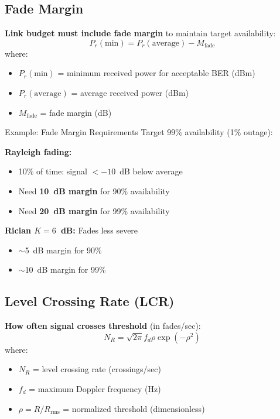 \subsection{Fade Margin}

\textbf{Link budget must include fade margin} to maintain target availability:
\begin{equation}
P_r(\text{min}) = P_r(\text{average}) - M_{\text{fade}}
\label{eq:fade-margin}
\end{equation}
where:
\begin{itemize}
\item $P_r(\text{min})$ = minimum received power for acceptable BER (dBm)
\item $P_r(\text{average})$ = average received power (dBm)
\item $M_{\text{fade}}$ = fade margin (dB)
\end{itemize}

\begin{calloutbox}{Example: Fade Margin Requirements}
Target 99\% availability (1\% outage):

\textbf{Rayleigh fading:}
\begin{itemize}
\item 10\% of time: signal $< -10$~dB below average
\item Need \textbf{10~dB margin} for 90\% availability
\item Need \textbf{20~dB margin} for 99\% availability
\end{itemize}

\textbf{Rician $K=6$~dB:} Fades less severe
\begin{itemize}
\item $\sim$5~dB margin for 90\%
\item $\sim$10~dB margin for 99\%
\end{itemize}
\end{calloutbox}

\subsection{Level Crossing Rate (LCR)}

\textbf{How often signal crosses threshold} (in fades/sec):
\begin{equation}
N_R = \sqrt{2\pi} f_d \rho \exp(-\rho^2)
\label{eq:level-crossing-rate}
\end{equation}
where:
\begin{itemize}
\item $N_R$ = level crossing rate (crossings/sec)
\item $f_d$ = maximum Doppler frequency (Hz)
\item $\rho = R/R_{\text{rms}}$ = normalized threshold (dimensionless)
\end{itemize}

